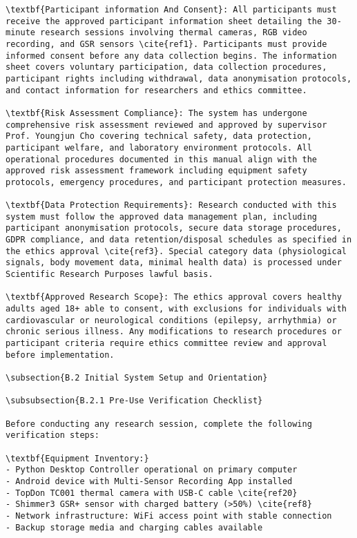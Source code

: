 \begin{verbatim}
\textbf{Participant information And Consent}: All participants must receive the approved participant information sheet detailing the 30-minute research sessions involving thermal cameras, RGB video recording, and GSR sensors \cite{ref1}. Participants must provide informed consent before any data collection begins. The information sheet covers voluntary participation, data collection procedures, participant rights including withdrawal, data anonymisation protocols, and contact information for researchers and ethics committee.

\textbf{Risk Assessment Compliance}: The system has undergone comprehensive risk assessment reviewed and approved by supervisor Prof. Youngjun Cho covering technical safety, data protection, participant welfare, and laboratory environment protocols. All operational procedures documented in this manual align with the approved risk assessment framework including equipment safety protocols, emergency procedures, and participant protection measures.

\textbf{Data Protection Requirements}: Research conducted with this system must follow the approved data management plan, including participant anonymisation protocols, secure data storage procedures, GDPR compliance, and data retention/disposal schedules as specified in the ethics approval \cite{ref3}. Special category data (physiological signals, body movement data, minimal health data) is processed under Scientific Research Purposes lawful basis.

\textbf{Approved Research Scope}: The ethics approval covers healthy adults aged 18+ able to consent, with exclusions for individuals with cardiovascular or neurological conditions (epilepsy, arrhythmia) or chronic serious illness. Any modifications to research procedures or participant criteria require ethics committee review and approval before implementation.

\subsection{B.2 Initial System Setup and Orientation}

\subsubsection{B.2.1 Pre-Use Verification Checklist}

Before conducting any research session, complete the following verification steps:

\textbf{Equipment Inventory:}
- Python Desktop Controller operational on primary computer
- Android device with Multi-Sensor Recording App installed
- TopDon TC001 thermal camera with USB-C cable \cite{ref20}
- Shimmer3 GSR+ sensor with charged battery (>50%) \cite{ref8}
- Network infrastructure: WiFi access point with stable connection
- Backup storage media and charging cables available


\end{verbatim}
